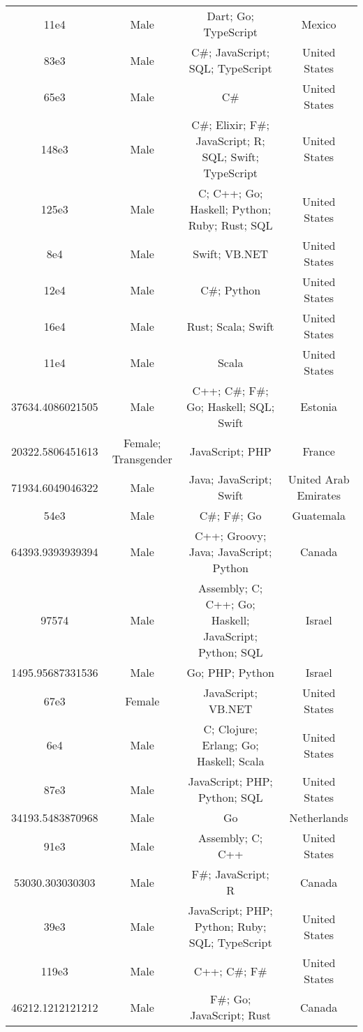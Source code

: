 \begin{center}
\begin{tabular}{ |c|c|c|c| }
11e4  &  Male  &  Dart; Go; TypeScript  &  Mexico  \\ 
83e3  &  Male  &  C\#; JavaScript; SQL; TypeScript  &  United States  \\ 
65e3  &  Male  &  C\#  &  United States  \\ 
148e3  &  Male  &  C\#; Elixir; F\#; JavaScript; R; SQL; Swift; TypeScript  &  United States  \\ 
125e3  &  Male  &  C; C++; Go; Haskell; Python; Ruby; Rust; SQL  &  United States  \\ 
8e4  &  Male  &  Swift; VB.NET  &  United States  \\ 
12e4  &  Male  &  C\#; Python  &  United States  \\ 
16e4  &  Male  &  Rust; Scala; Swift  &  United States  \\ 
11e4  &  Male  &  Scala  &  United States  \\ 
37634.4086021505  &  Male  &  C++; C\#; F\#; Go; Haskell; SQL; Swift  &  Estonia  \\ 
20322.5806451613  &  Female; Transgender  &  JavaScript; PHP  &  France  \\ 
71934.6049046322  &  Male  &  Java; JavaScript; Swift  &  United Arab Emirates  \\ 
54e3  &  Male  &  C\#; F\#; Go  &  Guatemala  \\ 
64393.9393939394  &  Male  &  C++; Groovy; Java; JavaScript; Python  &  Canada  \\ 
97574  &  Male  &  Assembly; C; C++; Go; Haskell; JavaScript; Python; SQL  &  Israel  \\ 
1495.95687331536  &  Male  &  Go; PHP; Python  &  Israel  \\ 
67e3  &  Female  &  JavaScript; VB.NET  &  United States  \\ 
6e4  &  Male  &  C; Clojure; Erlang; Go; Haskell; Scala  &  United States  \\ 
87e3  &  Male  &  JavaScript; PHP; Python; SQL  &  United States  \\ 
34193.5483870968  &  Male  &  Go  &  Netherlands  \\ 
91e3  &  Male  &  Assembly; C; C++  &  United States  \\ 
53030.303030303  &  Male  &  F\#; JavaScript; R  &  Canada  \\ 
39e3  &  Male  &  JavaScript; PHP; Python; Ruby; SQL; TypeScript  &  United States  \\ 
119e3  &  Male  &  C++; C\#; F\#  &  United States  \\ 
46212.1212121212  &  Male  &  F\#; Go; JavaScript; Rust  &  Canada  \\ 

\end{tabular}
\end{center}
